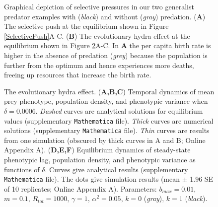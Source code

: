 \documentclass[11pt]{article}
\begin{document}
\begin{figure}[!h]
\centering
\caption{
Graphical depiction of selective pressures in our two generalist predator examples with (\textit{black}) and without (\textit{gray}) predation.
(\textbf{A}) The selective push at the equilibrium shown in Figure \ref{SelectivePush}A-C.
(\textbf{B}) The evolutionary hydra effect at the equilibrium shown in Figure \ref{HydraEffect}A-C.
In \textbf{A} the per capita birth rate is higher in the absence of predation (\textit{grey}) because the population is further from the optimum and hence experiences more deaths, freeing up resources that increase the birth rate.
}
\label{Lande}
\end{figure}

\begin{figure}[!h]
\centering
\caption{
The evolutionary hydra effect.
(\textbf{A,B,C}) Temporal dynamics of mean prey phenotype, population density, and phenotypic variance when $\delta = 0.0006$.
\textit{Dashed} curves are analytical solutions for equilibrium values (supplementary \texttt{Mathematica} file). 
\textit{Thick} curves are numerical solutions (supplementary \texttt{Mathematica} file). 
\textit{Thin} curves are results from one simulation (obscured by thick curves in A and B; Online Appendix A). 
(\textbf{D,E,F}) Equilibrium dynamics of steady-state phenotypic lag, population density, and phenotypic variance as functions of $\delta$.
Curves give analytical results (supplementary \texttt{Mathematica} file). 
The dots give simulation results (mean $\pm$ 1.96 SE of 10 replicates; Online Appendix A).
Parameters: $b_{max}=0.01$, $m=0.1$, $R_{tot}=1000$, $\gamma=1$, $\alpha^2=0.05$, $k = 0$ (\textit{gray}), $k=1$ (\textit{black}).
}
\label{HydraEffect}
\end{figure}
\end{document}
